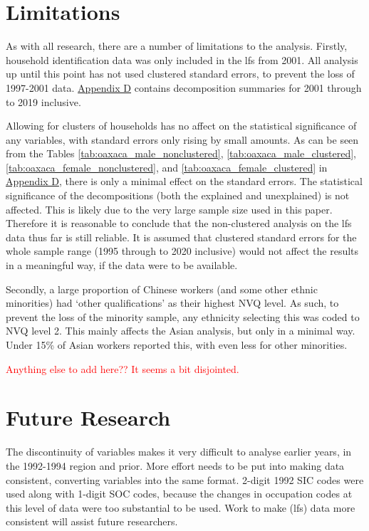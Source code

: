 \documentclass[class=article, crop=false]{standalone}
\begin{document}
\section{Limitations}
\label{sec:limitations}
As with all research, there are a number of limitations to the analysis. Firstly, household identification data was only included in the \acrlong{lfs} from 2001. All analysis up until this point has not used clustered standard errors, to prevent the loss of 1997-2001 data. \hyperref[sec:appendixA]{Appendix D} contains decomposition summaries for 2001 through to 2019 inclusive. 

Allowing for clusters of households has no affect on the statistical significance of any variables, with standard errors only rising by small amounts. As can be seen from the Tables \ref{tab:oaxaca_male_nonclustered}, \ref{tab:oaxaca_male_clustered},  \ref{tab:oaxaca_female_nonclustered}, and \ref{tab:oaxaca_female_clustered} in \hyperref[sec:appendixD]{Appendix D}, there is only a minimal effect on the standard errors. The statistical significance of the decompositions (both the explained and unexplained) is not affected. This is likely due to the very large sample size used in this paper. Therefore it is reasonable to conclude that the non-clustered analysis on the \acrshort{lfs} data thus far is still reliable. It is assumed that clustered standard errors for the whole sample range (1995 through to 2020 inclusive) would not affect the results in a meaningful way, if the data were to be available.

Secondly, a large proportion of Chinese workers (and some other ethnic minorities) had \enquote*{other qualifications} as their highest NVQ level. As such, to prevent the loss of the minority sample, any ethnicity selecting this was coded to NVQ level 2. This mainly affects the Asian analysis, but only in a minimal way. Under 15\% of Asian workers reported this, with even less for other minorities.

\textcolor{red}{Anything else to add here?? It seems a bit disjointed.}

\section{Future Research}
\label{sec:Future Research}
The discontinuity of variables makes it very difficult to analyse earlier years, in the 1992-1994 region and prior. More effort needs to be put into making data consistent, converting variables into the same format. 2-digit 1992 SIC codes were used along with 1-digit SOC codes, because the changes in occupation codes at this level of data were too substantial to be used. Work to make (\acrshort{lfs}) data more consistent will assist future researchers.
\end{document}
